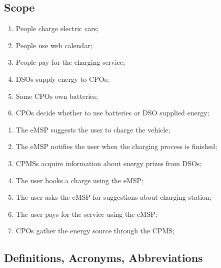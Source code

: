 \subsection{Scope}

\begin{enumerate}[label=W\arabic*]
    \item People charge electric cars; \label{world:people-charge-cars}
    \item People use web calendar; \label{world:people-use-calendars}
    \item People pay for the charging service; \label{world:people-pay-service}
    \item \acp{DSO} supply energy to \acp{CPO}; \label{world:DSO-supply-energy}
    \item Some \acp{CPO} own batteries; \label{world:CPO-own-batteries}
    \item \acp{CPO} decide whether to use batteries or \ac{DSO} supplied energy; \label{world:CPO-decide-energy}
\end{enumerate}
\begin{enumerate}[label=S\arabic*]
    \item The \ac{eMSP} suggests the user to charge the vehicle; \label{shared:eMSP-suggests-charge}
    \item The \ac{eMSP} notifies the user when the charging process is finished; \label{shared:eMSP-notifies-charging-finished}
    \item \acp{CPMS} acquire information about energy prizes from \acp{DSO}; \label{shared:CPMS-info-from-DSO}
    \item The user books a charge using the \ac{eMSP}; \label{shared:user-books-charge}
    \item The user asks the \ac{eMSP} for suggestions about charging station; \label{shared:user-asks-suggestions}
    \item The user pays for the service using the \ac{eMSP}; \label{shared:user-pays-service}
    \item \acp{CPO} gather the energy source through the \ac{CPMS}; \label{shared:CPO-energy-through-CPMS}
\end{enumerate}

\subsection{Definitions, Acronyms, Abbreviations}
\begin{multicols}{2}[]
    \begin{acronym}[RASD]
    \end{acronym}
\end{multicols}


